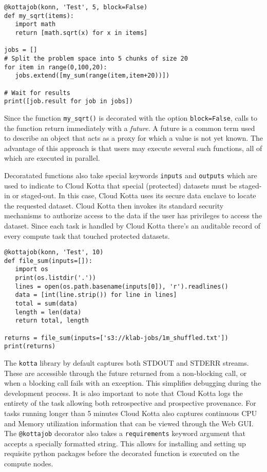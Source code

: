 \begin{lstlisting}
@kottajob(konn, 'Test', 5, block=False)
def my_sqrt(items):
   import math
   return [math.sqrt(x) for x in items]

jobs = []
# Split the problem space into 5 chunks of size 20
for item in range(0,100,20):
   jobs.extend([my_sum(range(item,item+20))])

# Wait for results
print([job.result for job in jobs])
\end{lstlisting}

Since the function \texttt{my\_sqrt()} is decorated with the option \texttt{block=False}, calls to
the function return immediately with a \emph{future}. A future is a common term used to describe
an object that acts as a proxy for which a value is not yet known. 
The advantage of this approach is that users may execute several such functions, all
of which are executed in parallel.

Decoratated functions also take special keywords \texttt{inputs} and \texttt{outputs} which are
used to indicate to Cloud Kotta that special (protected) datasets must be staged-in or staged-out.
In this case, Cloud Kotta uses its secure data enclave to locate the requested dataset. Cloud Kotta
then invokes its standard security mechanisms to authorize access to the data if the user
has privileges to access the dataset. 
Since each task is handled by Cloud Kotta there's an auditable
record of every compute task that touched protected datasets.

\begin{lstlisting}
@kottajob(konn, 'Test', 10)
def file_sum(inputs=[]):
   import os
   print(os.listdir('.'))
   lines = open(os.path.basename(inputs[0]), 'r').readlines()
   data = [int(line.strip()) for line in lines]
   total = sum(data)
   length = len(data)
   return total, length

returns = file_sum(inputs=['s3://klab-jobs/1m_shuffled.txt'])
print(returns)
\end{lstlisting}

The \texttt{kotta} library by default captures both STDOUT and STDERR streams. These are accessible through
the future returned from a non-blocking call, or when a blocking call fails with an exception.
This simplifies debugging during the development process. It is also important to note that Cloud Kotta
logs the entirety of the task allowing both retrospective and prospective provenance. For tasks running
longer than 5 minutes Cloud Kotta also captures continuous CPU and Memory utilization information that can be viewed
through the Web GUI. The \texttt{@kottajob} decorator also takes a \texttt{requirements} keyword argument that
accepts a specially formatted string. This allows for installing and setting up requisite python packages
before the decorated function is executed on the compute nodes.

